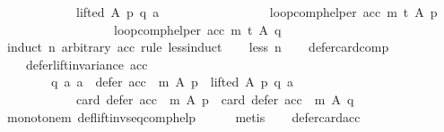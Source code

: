 \begin{isabellebody}
\ \ \ \ \ \ \ \ \ \ \ \ lifted\ A\ p\ q\ a{\isacharparenright}{\kern0pt}\ {\isasymlongrightarrow}\isanewline
\ \ \ \ \ \ \ \ \ \ \ \ \ \ \ \ {\isacharparenleft}{\kern0pt}loop{\isacharunderscore}{\kern0pt}comp{\isacharunderscore}{\kern0pt}helper\ acc\ m\ t{\isacharparenright}{\kern0pt}\ A\ p\ {\isacharequal}{\kern0pt}\isanewline
\ \ \ \ \ \ \ \ \ \ \ \ \ \ \ \ \ \ {\isacharparenleft}{\kern0pt}loop{\isacharunderscore}{\kern0pt}comp{\isacharunderscore}{\kern0pt}helper\ acc\ m\ t{\isacharparenright}{\kern0pt}\ A\ q{\isacharparenright}{\kern0pt}{\isachardoublequoteclose}\isanewline
%
\isadelimproof
%
\endisadelimproof
%
\isatagproof
{}\isamarkupfalse%
\ {\isacharparenleft}{\kern0pt}induct\ n\ arbitrary{\isacharcolon}{\kern0pt}\ acc\ rule{\isacharcolon}{\kern0pt}\ less{\isacharunderscore}{\kern0pt}induct{\isacharparenright}{\kern0pt}\isanewline
\ \ \isamarkupfalse%
\ {\isacharparenleft}{\kern0pt}less\ n{\isacharparenright}{\kern0pt}\isanewline
\ \ \isamarkupfalse%
\ defer{\isacharunderscore}{\kern0pt}card{\isacharunderscore}{\kern0pt}comp{\isacharcolon}{\kern0pt}\isanewline
\ \ \ \ {\isachardoublequoteopen}defer{\isacharunderscore}{\kern0pt}lift{\isacharunderscore}{\kern0pt}invariance\ acc\ {\isasymlongrightarrow}\isanewline
\ \ \ \ \ \ \ \ {\isacharparenleft}{\kern0pt}{\isasymforall}q\ a{\isachardot}{\kern0pt}\ {\isacharparenleft}{\kern0pt}a\ {\isasymin}\ {\isacharparenleft}{\kern0pt}defer\ {\isacharparenleft}{\kern0pt}acc\ {\isasymtriangleright}\ m{\isacharparenright}{\kern0pt}\ A\ p{\isacharparenright}{\kern0pt}\ {\isasymand}\ lifted\ A\ p\ q\ a{\isacharparenright}{\kern0pt}\ {\isasymlongrightarrow}\isanewline
\ \ \ \ \ \ \ \ \ \ \ \ card\ {\isacharparenleft}{\kern0pt}defer\ {\isacharparenleft}{\kern0pt}acc\ {\isasymtriangleright}\ m{\isacharparenright}{\kern0pt}\ A\ p{\isacharparenright}{\kern0pt}\ {\isacharequal}{\kern0pt}\ card\ {\isacharparenleft}{\kern0pt}defer\ {\isacharparenleft}{\kern0pt}acc\ {\isasymtriangleright}\ m{\isacharparenright}{\kern0pt}\ A\ q{\isacharparenright}{\kern0pt}{\isacharparenright}{\kern0pt}{\isachardoublequoteclose}\isanewline
\ \ \ \ \isamarkupfalse%
\ monotone{\isacharunderscore}{\kern0pt}m\ def{\isacharunderscore}{\kern0pt}lift{\isacharunderscore}{\kern0pt}inv{\isacharunderscore}{\kern0pt}seq{\isacharunderscore}{\kern0pt}comp{\isacharunderscore}{\kern0pt}help\isanewline
\ \ \ \ \isamarkupfalse%
\ metis\isanewline
\ \ \isamarkupfalse%
\ defer{\isacharunderscore}{\kern0pt}card{\isacharunderscore}{\kern0pt}acc{\isacharcolon}{\kern0pt}\isanewline

\end{isabellebody}
